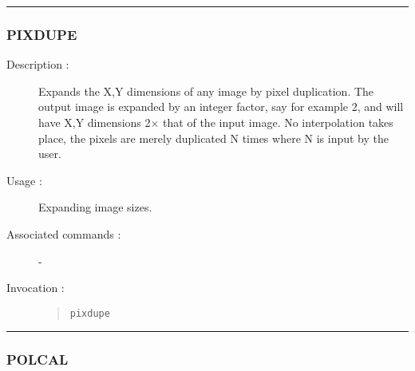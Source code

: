 \hrule 
\subsubsection*{\label{PIXDUPE}PIXDUPE}

\begin{description}

\item[Description :] Expands the X,Y dimensions of any image by pixel
duplication. The output image is expanded by an integer factor, say for
example 2, and will have X,Y dimensions 2$\times$ that of the input
image.  No interpolation takes place, the pixels are merely duplicated
N times where N is input by the user.

\item[Usage :] Expanding image sizes.
\item[Associated commands :] -
\item[Invocation :]

\begin{quote}{\tt  pixdupe }\end{quote}

\end{description}

\hrule 
\subsubsection*{\label{POLCAL}POLCAL}

